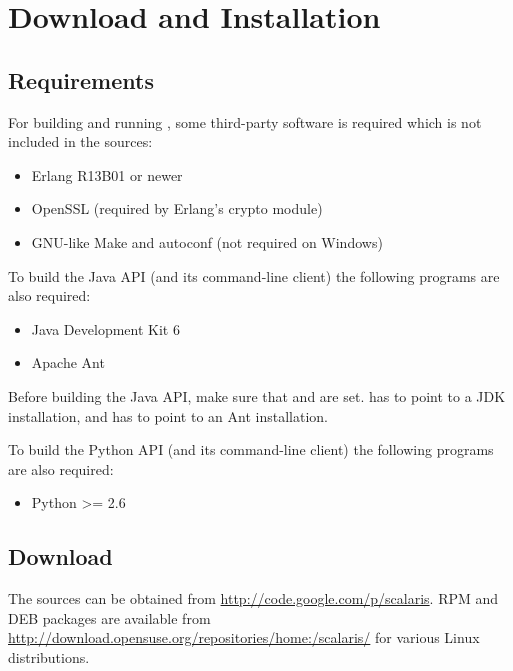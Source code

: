 \chapter{Download and Installation}

\section{Requirements}
\label{sec.requirements}

For building and running \scalaris{}, some third-party software is
required which is not included in the \scalaris{} sources:

\begin{itemize}
\setlength{\itemsep}{0pt}
\setlength{\parskip}{0pt}
\item Erlang R13B01 or newer
\item OpenSSL (required by Erlang's crypto module)
\item GNU-like Make and autoconf (not required on Windows)
\end{itemize}

To build the Java API (and its command-line client) the following
programs are also required:

\begin{itemize}
\setlength{\itemsep}{0pt}
\setlength{\parskip}{0pt}
\item Java Development Kit 6
\item Apache Ant
\end{itemize}

Before building the Java API, make sure that  and
 are set.  has to point to a JDK
installation, and  has to point to an Ant installation.

To build the Python API (and its command-line client) the following
programs are also required:

\begin{itemize}
\setlength{\itemsep}{0pt}
\setlength{\parskip}{0pt}
\item Python >= 2.6
\end{itemize}

\section{Download}

The sources can be obtained from
\url{http://code.google.com/p/scalaris}. RPM and DEB packages are available
from \url{http://download.opensuse.org/repositories/home:/scalaris/} for
various Linux distributions.

